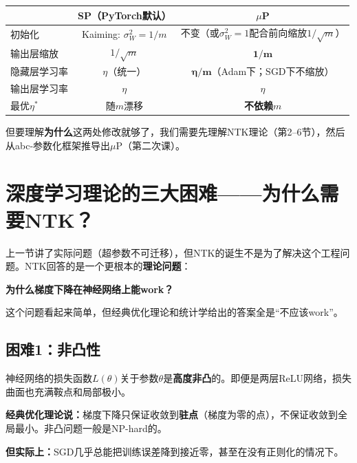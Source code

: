 \documentclass[11pt,a4paper]{article}
\begin{document}
\begin{center}
\renewcommand{\arraystretch}{1.3}
\begin{tabular}{l|cc}
\toprule
& SP（PyTorch默认） & $\mu$P \\
\midrule
初始化 & Kaiming: $\sigma_W^2=1/m$ & 不变（或$\sigma_W^2=1$配合前向缩放$1/\sqrt{m}$） \\
输出层缩放 & $1/\sqrt{m}$ & $\mathbf{1/m}$ \\
隐藏层学习率 & $\eta$（统一） & $\mathbf{\eta/m}$（Adam下；SGD下不缩放） \\
输出层学习率 & $\eta$ & $\eta$ \\
最优$\eta^*$ & 随$m$漂移 & \textbf{不依赖$m$} \\
\bottomrule
\end{tabular}
\end{center}

但要理解\textbf{为什么}这两处修改就够了，我们需要先理解NTK理论（第2--6节），然后从abc-参数化框架推导出$\mu$P（第二次课）。

\section{深度学习理论的三大困难——为什么需要NTK？}

上一节讲了实际问题（超参数不可迁移），但NTK的诞生不是为了解决这个工程问题。NTK回答的是一个更根本的\textbf{理论问题}：

\begin{tcolorbox}[colback=blue!5,colframe=blue!50!black,title=\textbf{深度学习理论的核心追问}]
\textbf{为什么梯度下降在神经网络上能work？}

这个问题看起来简单，但经典优化理论和统计学给出的答案全是``不应该work''。
\end{tcolorbox}

\subsection{困难1：非凸性}

神经网络的损失函数$L(\theta)$关于参数$\theta$是\textbf{高度非凸}的。即便是两层ReLU网络，损失曲面也充满鞍点和局部极小。

\textbf{经典优化理论说：}梯度下降只保证收敛到\textbf{驻点}（梯度为零的点），不保证收敛到全局最小。非凸问题一般是NP-hard的。

\textbf{但实际上：}SGD几乎总能把训练误差降到接近零，甚至在没有正则化的情况下。
\end{document}
